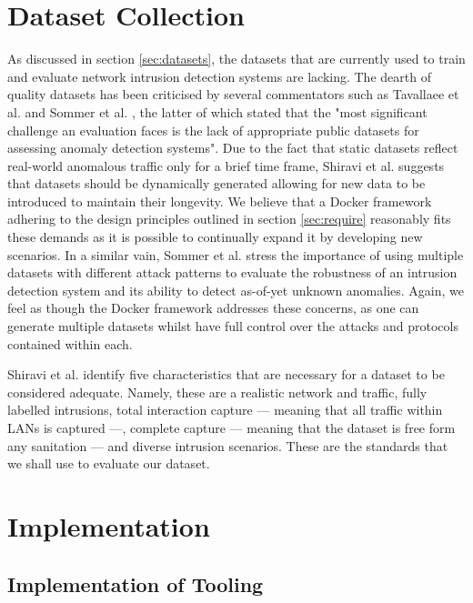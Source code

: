 \documentclass[msc,deptreport, cs]{infthesis} %
\begin{document}
\section{Dataset Collection}
\label{dataset_require}
As discussed in section \ref{sec:datasets}, the datasets that are currently used to train and evaluate network intrusion detection systems are lacking. The dearth of quality datasets has been criticised by several commentators such as Tavallaee et al. \cite{tavallaee2009detailed} and Sommer et al. \cite{sommer2010outside}, the latter of which stated that the "most significant challenge an evaluation faces is the lack of appropriate public datasets for assessing anomaly detection systems". Due to the fact that static datasets reflect real-world anomalous traffic only for a brief time frame, Shiravi et al. \cite{shiravi2012toward} suggests that datasets should be dynamically generated allowing for new data to be introduced to maintain their longevity. We believe that a Docker framework adhering to the design principles outlined in section \ref{sec:require} reasonably fits these demands as it is possible to continually expand it by developing new scenarios. In a similar vain, Sommer et al. stress the importance of using multiple datasets with different attack patterns to evaluate the robustness of an intrusion detection system and its ability to detect as-of-yet unknown anomalies. Again, we feel as though the Docker framework addresses these concerns, as one can generate multiple datasets whilst have full control over the attacks and protocols contained within each.



Shiravi et al. identify five characteristics that are necessary for a dataset to be considered adequate. Namely, these are a realistic network and traffic, fully labelled intrusions, total interaction capture --- meaning that all traffic within LANs is captured ---, complete capture --- meaning that the dataset is free form any sanitation --- and diverse intrusion scenarios. These are the standards that we shall use to evaluate our dataset.


\section{Implementation}

\subsection{Implementation of Tooling}
\end{document}
